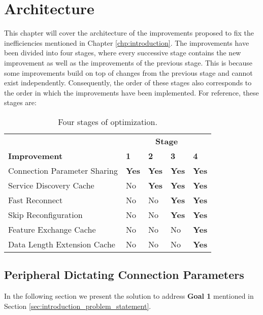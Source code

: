 \chapter{Architecture}
\label{chp:chapter_3}
This chapter will cover the architecture of the improvements proposed to fix the inefficiencies mentioned in Chapter \ref{chp:introduction}. The improvements have been divided into four stages, where every successive stage contains the new improvement as well as the improvements of the previous stage. This is because some improvements build on top of changes from the previous stage and cannot exist independently. Consequently, the order of these stages also corresponds to the order in which the improvements have been implemented. For reference, these stages are: 
\begin{table}[h]
    \begin{center}
    \begin{tabular}{|l|l|l|l|l|}
        \hline
                                     & \multicolumn{4}{c|}{\textbf{Stage}}   \\
        \textbf{Improvement}         & \textbf{1} & \textbf{2} & \textbf{3} & \textbf{4} \\
        \hline
        Connection Parameter Sharing & \textbf{Yes}        & \textbf{Yes}        & \textbf{Yes}        & \textbf{Yes} \\
        \hline
        Service Discovery Cache      & No         & \textbf{Yes}        & \textbf{Yes}        & \textbf{Yes} \\
        \hline
        Fast Reconnect               & No         & No         & \textbf{Yes}        & \textbf{Yes} \\
        \hline
        Skip Reconfiguration         & No         & No         & \textbf{Yes}        & \textbf{Yes} \\
        \hline
        Feature Exchange Cache       & No         & No         & No         & \textbf{Yes} \\
        \hline
        Data Length Extension Cache  & No         & No         & No         & \textbf{Yes} \\
        \hline
    \end{tabular}
    \end{center}
    \caption{Four stages of optimization.}
    \label{tbl:opt_stages}
\end{table}

\section{Peripheral Dictating Connection Parameters}
In the following section we present the solution to address \textbf{Goal 1} mentioned in Section \ref{sec:introduction_problem_statement}.
